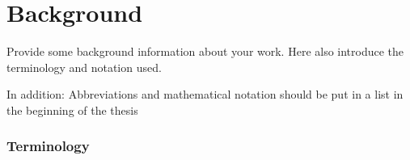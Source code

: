 \chapter{Background} \label{sec:background}

Provide some background information about your work.
Here also introduce the terminology and notation used.


In addition: Abbreviations and mathematical notation should be put in a list in the beginning of the thesis 


\subsection{Terminology} \label{subsec.terminology}



\newpage